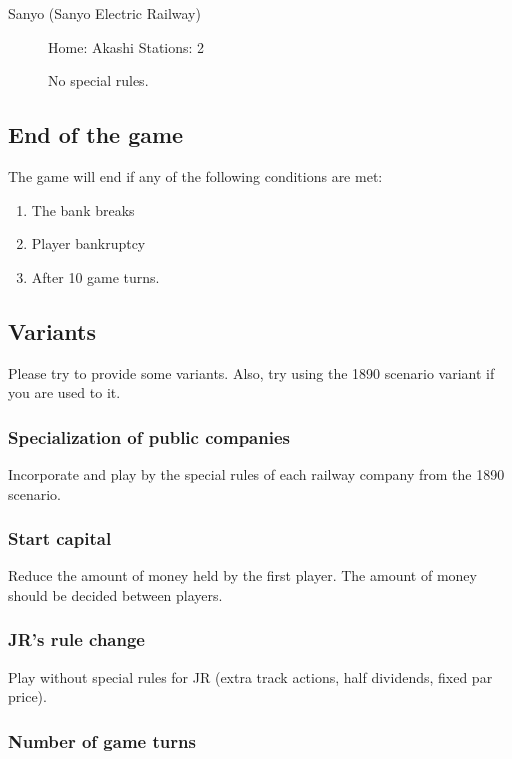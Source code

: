 \documentclass{article}
\begin{document}
\begin{CJK}{UTF8}{min}
\begin{multicols}{2}
\begin{description}
\item[Sanyo (Sanyo Electric Railway)] Home: Akashi Stations: 2

No special rules.
\end{description}
\subsection{End of the game}

The game will end if any of the following conditions are met:
\begin{enumerate}
\item The bank breaks

\item Player bankruptcy

\item After 10 game turns.
\end{enumerate}

\subsection{Variants}

Please try to provide some variants. Also, try using the 1890 scenario
variant if you are used to it.

\subsubsection{Specialization of public companies}

Incorporate and play by the special rules of each railway company from the
1890 scenario.

\subsubsection{Start capital}

Reduce the amount of money held by the first player. The amount of
money should be decided between players.

\subsubsection{JR's rule change}

Play without special rules for JR (extra track actions, half
dividends, fixed par price).

\subsubsection{Number of game turns}


\end{multicols}
\end{CJK}
\end{document}
